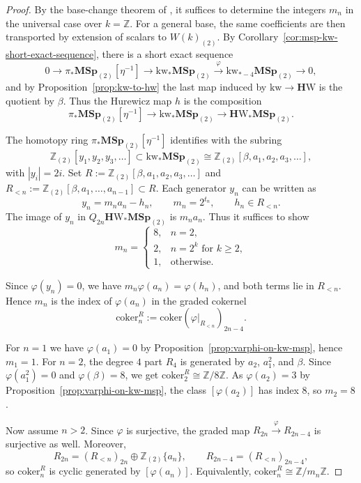 \documentclass[a4paper]{amsart}
\theoremstyle{plain}
\theoremstyle{definition}
\newcommand{\MSp}{\mathbf{MSp}}
\newcommand{\etainv}{\eta^{-1}}
\newcommand{\HW}{\mathbf{H}\mathrm{W}}
\newcommand{\kw}{\mathrm{kw}}
\newcommand{\ZZ}{\mathbb{Z}}
\newcommand{\coker}{\mathrm{coker}}
\renewcommand{\ge}{\geqslant}
\begin{document}
\begin{proof}
	By the base-change theorem of \cite[Theorem~4.5]{bachmann2022eta}, it suffices to determine the integers $m_n$ in the universal case over $k = \ZZ$. For a general base, the same coefficients are then transported by extension of scalars to $W(k)_{(2)}$.
	By Corollary~\ref{cor:msp-kw-short-exact-sequence}, there is a short exact sequence
	\[
		0 \to \pi_* \MSp_{(2)}[\etainv] \to \kw_*\MSp_{(2)} \xrightarrow{\varphi} \kw_{*-4}\MSp_{(2)} \to 0,
	\]
	and by Proposition~\ref{prop:kw-to-hw} the last map induced by $\kw \to \HW$ is the quotient by $\beta$. Thus the Hurewicz map $h$ is the composition
	\[
		\pi_* \MSp_{(2)}[\etainv] \to \kw_*\MSp_{(2)} \to \HW_*\MSp_{(2)}.
	\]

	The homotopy ring $\pi_* \MSp_{(2)}[\etainv]$ identifies with the subring
	\[
		\ZZ_{(2)}[y_1,y_2,y_3,\ldots] \subset \kw_*\MSp_{(2)} \cong \ZZ_{(2)}[\beta,a_1,a_2,a_3,\ldots],
	\]
	with $|y_i|=2i$. Set $R:=\ZZ_{(2)}[\beta,a_1,a_2,a_3,\ldots]$ and $R_{<n}:=\ZZ_{(2)}[\beta,a_1,\ldots,a_{n-1}]\subset R$. Each generator $y_n$ can be written as
	\[
		y_n=m_n a_n-h_n,\qquad m_n=2^{t_n},\qquad h_n\in R_{<n}.
	\]
	The image of $y_n$ in $Q_{2n} \HW_*\MSp_{(2)}$ is $m_n a_n$. Thus it suffices to show
	\[
		m_n= \begin{cases}
			8, & n=2,                      \\
			2, & n=2^k\text{ for }k \ge 2, \\
			1, & \text{otherwise.}
		\end{cases}
	\]

	Since $\varphi(y_n)=0$, we have $m_n\varphi(a_n)=\varphi(h_n)$, and both terms lie in $R_{<n}$. Hence $m_n$ is the index of $\varphi(a_n)$ in the graded cokernel
	\[
		\coker_n^R:=\coker \left(\varphi|_{R_{<n}}\right)_{2n-4}.
	\]

	For $n=1$ we have $\varphi(a_1)=0$ by Proposition~\ref{prop:varphi-on-kw-msp}, hence $m_1=1$. For $n=2$, the degree $4$ part $R_4$ is generated by $a_2$, $a_1^2$, and $\beta$. Since $\varphi(a_1^2)=0$ and $\varphi(\beta)=8$, we get $\coker_2^R\cong \ZZ/8\ZZ$. As $\varphi(a_2)=3$ by Proposition~\ref{prop:varphi-on-kw-msp}, the class $[\varphi(a_2)]$ has index $8$, so $m_2=8$.

	Now assume $n>2$. Since $\varphi$ is surjective, the graded map $R_{2n}\xrightarrow{\varphi}R_{2n-4}$ is surjective as well. Moreover,
	\[
		R_{2n}=(R_{<n})_{2n}\oplus \ZZ_{(2)}\{a_n\}, \qquad R_{2n-4}=(R_{<n})_{2n-4},
	\]
	so $\coker_n^R$ is cyclic generated by $[\varphi(a_n)]$. Equivalently, $\coker_n^R\cong \ZZ/m_n\ZZ$.


\end{proof}
\end{document}
